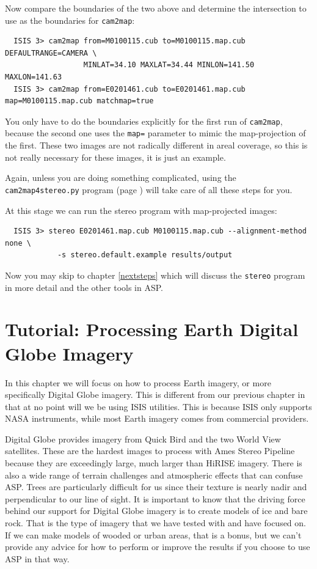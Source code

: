 Now compare the boundaries of the two above and determine the intersection to use as the boundaries for \texttt{cam2map}:

\begin{verbatim}
  ISIS 3> cam2map from=M0100115.cub to=M0100115.map.cub DEFAULTRANGE=CAMERA \
                  MINLAT=34.10 MAXLAT=34.44 MINLON=141.50 MAXLON=141.63
  ISIS 3> cam2map from=E0201461.cub to=E0201461.map.cub map=M0100115.map.cub matchmap=true
\end{verbatim}

You only have to do the boundaries explicitly for the first run of
\texttt{cam2map}, because the second one uses the \texttt{map=}
parameter to mimic the map-projection of the first.  These two
images are not radically different in areal coverage, so this is not
really necessary for these images, it is just an example.

Again, unless you are doing something complicated, using the
\texttt{cam2map4stereo.py} program (page \pageref{cam2map4stereo})
will take care of all these steps for you.

At this stage we can run the stereo program with map-projected images:

\begin{verbatim}
  ISIS 3> stereo E0201461.map.cub M0100115.map.cub --alignment-method none \
            -s stereo.default.example results/output
\end{verbatim}

Now you may skip to chapter \ref{nextsteps} which will discuss the
\texttt{stereo} program in more detail and the other tools in ASP.

\chapter{Tutorial: Processing Earth Digital Globe Imagery}
\label{ch:dg_tutorial}

In this chapter we will focus on how to process Earth imagery, or more
specifically Digital Globe imagery. This is different from our previous
chapter in that at no point will we be using ISIS utilities. This is
because ISIS only supports NASA instruments, while most Earth imagery
comes from commercial providers.

Digital Globe provides imagery from Quick Bird and the two World
View satellites. These are the hardest images to process with Ames
Stereo Pipeline because they are exceedingly large, much larger than
HiRISE imagery. There is also a wide range of terrain challenges and
atmospheric effects that can confuse ASP. Trees are particularly
difficult for us since their texture is nearly nadir and perpendicular
to our line of sight. It is important to know that the driving force
behind our support for Digital Globe imagery is to create models of
ice and bare rock. That is the type of imagery that we have tested
with and have focused on. If we can make models of wooded or urban
areas, that is a bonus, but we can't provide any advice for how to
perform or improve the results if you choose to use ASP in that way.

